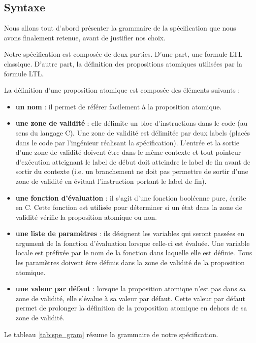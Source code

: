 \subsection{Syntaxe}

Nous allons tout d'abord présenter la grammaire de la spécification que
nous avons finalement retenue, avant de justifier nos choix.

Notre spécification est composée de deux parties. D'une part, une formule LTL
classique. D'autre part, la définition des propositions atomiques utilisées
par la formule LTL.

La définition d'une proposition atomique est composée des éléments suivants :

\begin{itemize}
\item
  \textbf{un nom} : il permet de référer facilement à la proposition atomique.
\item
  \textbf{une zone de validité} : elle délimite un bloc d'instructions dans
  le code (au sens du langage C). Une zone de validité est délimitée par deux
  labels (placés dans le code par l'ingénieur réalisant la spécification).
  L'entrée et la sortie d'une zone de validité doivent être dans le même
  contexte et tout pointeur d'exécution atteignant le label de début doit
  atteindre le label de fin avant de sortir du contexte (i.e. un branchement ne
  doit pas permettre de sortir d'une zone de validité en évitant l'instruction
  portant le label de fin).
\item
  \textbf{une fonction d'évaluation} : il s'agit d'une fonction booléenne pure,
  écrite en C. Cette fonction est utilisée pour déterminer si un état
  dans la zone de validité vérifie la proposition atomique ou non.
\item
\textbf{une liste de paramètres} : ils désignent les variables qui seront
  passées en argument de la fonction d'évaluation lorsque celle-ci est évaluée.
  Une variable locale est préfixée par le nom de la fonction dans laquelle elle
  est définie. Tous les paramètres doivent être définis dans la zone de validité
  de la proposition atomique.
\item
  \textbf{une valeur par défaut} : lorsque la proposition atomique n'est pas dans
  sa zone de validité, elle s'évalue à sa valeur par défaut. Cette valeur par
  défaut permet de prolonger la définition de la proposition atomique en dehors
  de sa zone de validité.
\end{itemize}

Le tableau \ref{tab:spe_gram} résume la grammaire de notre spécification.

